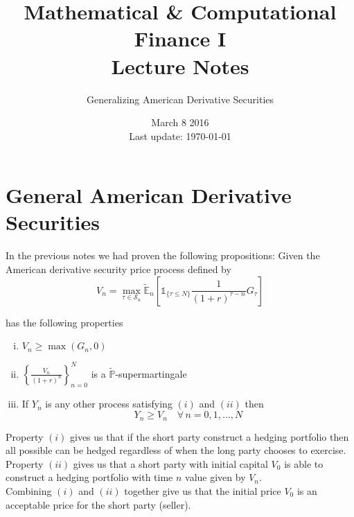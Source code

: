 \documentclass[12pt]{article}
\newlength\tindent
\renewcommand{\indent}{\hspace*{\tindent}}
\renewcommand{\P}{\mathbb P}
\newcommand{\E}{\mathbb E}
\begin{document}
 
 
\title{Mathematical \& Computational Finance I\\Lecture Notes}
\author{Generalizing American Derivative Securities}
\date{March 8 2016 \\ Last update: \today{}}
\maketitle

\section{General American Derivative Securities}

\indent In the previous notes we had proven the following propositions: Given the American derivative security price process defined by
\begin{equation*}
	V_n = \max_{\tau \in \mathcal S_n} \tilde{\E}_n \left[ \mathds 1_{\{\tau \leq N\}} \frac{1}{(1 + r)^{\tau - n}} G_\tau \right]
\end{equation*}

has the following properties
\begin{enumerate}[(i)]
	\item $V_n \geq \max(G_n, 0)$
	\item $\left\{ \frac{V_n}{(1 + r)^n} \right\}^N_{n = 0}$ is a $\tilde{\P}$-supermartingale
	\item If $Y_n$ is any other process satisfying $(i)$ and $(ii)$ then 
	\begin{equation*}
		Y_n \geq V_n \quad \forall\,n = 0,1,...,N
	\end{equation*}
\end{enumerate}

\indent Property $(i)$ gives us that if the short party construct a hedging portfolio then all possible  can be hedged regardless of when the long party chooses to exercise. \\

\indent Property $(ii)$ gives us that a short party with initial capital $V_0$ is able to construct a hedging portfolio with time $n$ value given by $V_n$. \\

\indent Combining $(i)$ and $(ii)$ together give us that the initial price $V_0$ is an acceptable price for the short party (seller). \\
\end{document}
